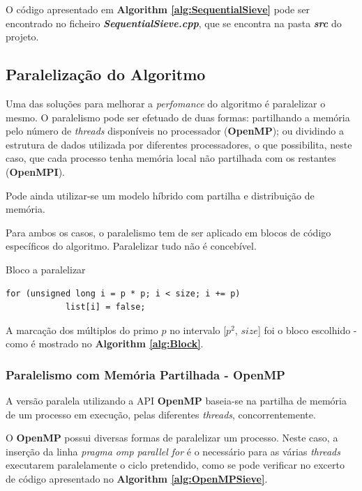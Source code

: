 \documentclass[a4paper]{article}
\begin{document}
O código apresentado em \textbf{Algorithm \ref{alg:SequentialSieve}} pode ser encontrado no ficheiro \textbf{\textit{SequentialSieve.cpp}}, que se encontra na pasta \textbf{\textit{src}} do projeto.
 
\subsection{Paralelização do Algoritmo}
 
Uma das soluções para melhorar a \textit{perfomance} do algoritmo é paralelizar o mesmo. O paralelismo pode ser efetuado de duas formas: partilhando a memória pelo número de \textit{threads} disponíveis no processador (\textbf{OpenMP}); ou dividindo a estrutura de dados utilizada por diferentes processadores, o que possibilita, neste caso, que cada processo tenha memória local não partilhada com os restantes (\textbf{OpenMPI}).

Pode ainda utilizar-se um modelo híbrido com partilha e distribuição de memória.

Para ambos os casos, o paralelismo tem de ser aplicado em blocos de código específicos do algoritmo. Paralelizar tudo não é concebível.

\begin{algorithm}
\caption{Bloco a paralelizar}
\label{alg:Block}
\begin{lstlisting}
for (unsigned long i = p * p; i < size; i += p)
			list[i] = false;
\end{lstlisting}
\end{algorithm}

A marcação dos múltiplos do primo $p$ no intervalo [$p^2$, $size$] foi o bloco escolhido - como é mostrado no \textbf{Algorithm \ref{alg:Block}}.

\subsubsection{Paralelismo com Memória Partilhada - OpenMP}

A versão paralela utilizando a API \textbf{OpenMP} baseia-se na partilha de memória de um processo em execução, pelas diferentes \textit{threads}, concorrentemente.

O \textbf{OpenMP} possui diversas formas de paralelizar um processo. Neste caso, a inserção da linha \textit{pragma omp parallel for} é o necessário para as várias \textit{threads} executarem paralelamente o ciclo pretendido, como se pode verificar no excerto de código apresentado no \textbf{Algorithm \ref{alg:OpenMPSieve}}.
\end{document}
